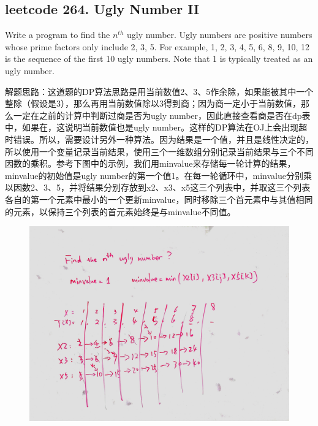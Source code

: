 \documentclass[a4paper,10pt]{article}
\begin{document}
\subsection{leetcode 264. Ugly Number II}
Write a program to find the $n^{th}$ ugly number. Ugly numbers are positive numbers whose prime factors only include 2, 3, 5. For example, 1, 2, 3, 4, 5, 6, 8, 9, 10, 12 is the sequence of the first 10 ugly numbers. Note that 1 is typically treated as an ugly number.\\

\begin{CJK*}{UTF8}{gbsn}
\noindent 解题思路：这道题的DP算法思路是用当前数值2、3、5作余除，如果能被其中一个整除（假设是3），那么再用当前数值除以3得到商；因为商一定小于当前数值，那么一定在之前的计算中判断过商是否为ugly number，因此直接查看商是否在dp表中，如果在，这说明当前数值也是ugly number。这样的DP算法在OJ上会出现超时错误。所以，需要设计另外一种算法。因为结果是一个值，并且是线性决定的，所以使用一个变量记录当前结果，使用三个一维数组分别记录当前结果与三个不同因数的乘积。参考下图中的示例，我们用minvalue来存储每一轮计算的结果，minvalue的初始值是ugly number的第一个值1。在每一轮循环中，minvalue分别乘以因数2、3、5，并将结果分别存放到x2、x3、x5这三个列表中，并取这三个列表各自的第一个元素中最小的一个更新minvalue，同时移除三个首元素中与其值相同的元素，以保持三个列表的首元素始终是与minvalue不同值。
\end{CJK*}

\begin{figure}[h]
\includegraphics[width=\textwidth]{leetcode264.jpg}
\centering
\end{figure}
\end{document}
